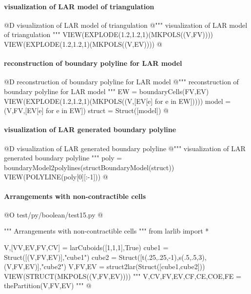 \documentclass[11pt,oneside]{article}    %
\begin{document}
\paragraph{visualization of LAR model of triangulation}
@D visualization of LAR model of triangulation
@{""" visualization of LAR model of triangulation """
VIEW(EXPLODE(1.2,1.2,1)(MKPOLS((V,FV))))
VIEW(EXPLODE(1.2,1.2,1)(MKPOLS((V,EV))))
@}

\paragraph{reconstruction of boundary polyline for LAR model}
@D reconstruction of boundary polyline for LAR model
@{""" reconstruction of boundary polyline for LAR model """
EW = boundaryCells(FV,EV)
VIEW(EXPLODE(1.2,1.2,1)(MKPOLS((V,[EV[e] for e in EW]))))
model = (V,FV,[EV[e] for e in EW])
struct = Struct([model])
@}

\paragraph{visualization of LAR generated boundary polyline}
@D visualization of LAR generated boundary polyline
@{""" visualization of LAR generated boundary polyline """
poly = boundaryModel2polylines(structBoundaryModel(struct))
VIEW(POLYLINE(poly[0][:-1]))
@}

\paragraph{Arrangements with non-contractible cells}

@O test/py/boolean/test15.py 
@{""" Arrangements with non-contractible cells """
from larlib import *

V,[VV,EV,FV,CV] = larCuboids([1,1,1],True)
cube1 = Struct([(V,FV,EV)],"cube1")
cube2 = Struct([t(.25,.25,-1),s(.5,.5,3),(V,FV,EV)],"cube2")
V,FV,EV = struct2lar(Struct([cube1,cube2]))
VIEW(STRUCT(MKPOLS((V,FV,EV))))
"""
V,CV,FV,EV,CF,CE,COE,FE = thePartition(V,FV,EV)
"""
@}
\end{document}
